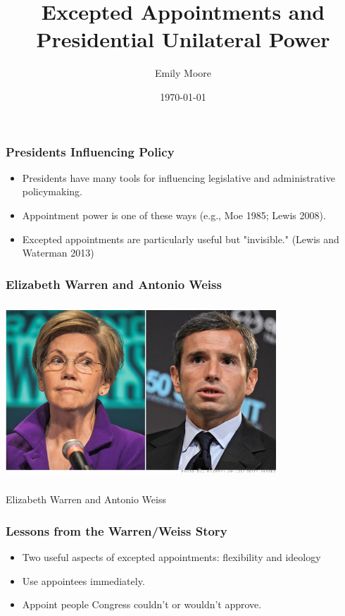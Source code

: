 \documentclass{beamer}
\title[Excepted Appointments and Presidential Unilateral Power]{Excepted Appointments and Presidential Unilateral Power}
\author{Emily Moore}
\institute[WUSTL]
{
Washington University-St. Louis \\
\medskip
{\emph{emily.moore@wustl.edu}}
}
\date{\today}
\begin{document}


%
\begin{frame}
\titlepage
\end{frame}
%
%

\begin{frame}
\frametitle{Presidents Influencing Policy}
\Large
\begin{itemize}\addtolength{\itemsep}{1\baselineskip}
\item Presidents have many tools for influencing legislative and administrative policymaking.
\item Appointment power is one of these ways (e.g., Moe 1985; Lewis 2008).
\item Excepted appointments are particularly useful but "invisible." (Lewis and Waterman 2013) 
\end{itemize}
\hfill%
\end{frame}


\begin{frame}
\frametitle{Elizabeth Warren and Antonio Weiss}
\begin{center}
\includegraphics[height=2.6in,width=4in]{WarrenWeiss.png}

Elizabeth Warren and Antonio Weiss
\end{center}
\end{frame}

\begin{frame}
\frametitle{Lessons from the Warren/Weiss Story}
\begin{itemize}\addtolength{\itemsep}{1.5\baselineskip}
\item Two useful aspects of excepted appointments: flexibility and ideology
\item Use appointees immediately.
\item Appoint people Congress couldn't or wouldn't approve.
\end{itemize}
\hfill%
\end{frame}
\end{document}
